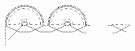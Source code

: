 \documentclass[aps,pra,reprint,superscriptaddress,twocolumn,notitlepage]{revtex4-1}
\numberwithin{equation}{section}
\begin{document}
\begin{equation}
    \tikz[scale=0.45,baseline=1.5ex]{
    \draw[dashed] (0,0) -- (1,0);
    \draw (-0.2,0.)-- (-0.2,-0.15);
    \draw (-0.2,-0.15)-- (1.,-0.7);
    \draw (1.2,-0.15)-- (1.2,0.0);
    \draw (1.2,-0.15)-- (0,-1.45);
    \draw[densely dotted,thick] (-0.3,0.)-- (-0.3,-2);
    \draw[densely dotted,thick] (1.3,-0.1)-- (1.3,0.);
    \draw[dashed] (2,0) -- (3,0);
    \draw (1.8,0.)-- (1.8,-0.15);
    \draw (1.8,-0.15)-- (3.,-0.7);
    \draw (3.2,-0.15)-- (3.2,0.);
    \draw (3.2,-0.15)-- (2,-0.7);
    \draw[densely dotted,thick] (1.7,0.)-- (1.7,-0.1);
    \draw[densely dotted,thick] (3.3,-0.1)-- (3.3,0.);
    \draw[dashed] (4,0) -- (5,0);
    \draw (3.8,0.)-- (3.8,-0.15);
    \draw (3.8,-0.15)-- (5.,-0.7);
    \draw (5.2,-0.15)-- (5.2,0.);
    \draw (5.2,-0.15)-- (4,-0.7);
    \draw[densely dotted,thick] (3.7,0.)-- (3.7,-0.1);
    \draw[densely dotted,thick] (5.3,-0.1)-- (5.3,0.);
    \draw[dashed] (6,0) -- (7,0);
    \draw (5.8,0.)-- (5.8,-0.15);
    \draw (5.8,-0.15)-- (7.,-0.8);
    \draw (7.3,-0.8)-- (7.,-0.8);
    \draw (7.2,-0.15)-- (7.2,0.);
    \draw (7.2,-0.15)-- (6,-0.7);
    \draw[densely dotted,thick] (5.7,0.)-- (5.7,-0.1);
    \draw[densely dotted,thick] (7.3,0)-- (7.3,-0.1);
    \draw[densely dotted,thick] (7.3,-0.1)-- (7.7,-0.1);
    \draw[densely dotted,thick] (1.3,-0.1)--(1.7,-0.1);
    \draw[densely dotted,thick] (3.3,-0.1)--(3.7,-0.1);
    \draw[densely dotted,thick] (5.3,-0.1)--(5.7,-0.1);
    \draw (1.0,-0.7)-- (2,-0.7);
    \draw (3.0,-0.7)-- (4,-0.7);
    \draw (5.0,-0.7)-- (6,-0.7);
    \draw[densely dotted,thick] (3.3,0) arc (0:180:1.8);
    \draw[densely dotted,thick] (1.7,0) arc (0:180:0.2);
    \draw[dashed] (2.0,0) arc (0:180:0.5);
    \draw[dashed] (3.0,0) arc (0:180:1.5);
    \draw (1.8,0) arc (0:180:0.3);
    \draw (3.2,0) arc (0:180:1.7);
    \draw[densely dotted,thick] (7.3,0) arc (0:180:1.8);
    \draw[densely dotted,thick] (5.7,0) arc (0:180:0.2);
    \draw[dashed] (6.0,0) arc (0:180:0.5);
    \draw[dashed] (7.0,0) arc (0:180:1.5);
    \draw (5.8,0) arc (0:180:0.3);
    \draw (7.2,0) arc (0:180:1.7);
    \draw[dashed] (10,0) -- (11,0);
    \draw (9.8,0.)-- (9.8,-0.15);
    \draw (9.8,-0.15)-- (11,-0.7);
    \draw (11.2,-0.15)-- (11.2,0.0);
    \draw (11.2,-0.15)-- (10,-0.8);
    \draw (9.7,-0.8)-- (10,-0.8);
    \draw[densely dotted,thick] (9.7,0.)-- (9.7,-0.1);
    \draw[densely dotted,thick] (9.3,-0.1)-- (9.7,-0.1);
    \draw[densely dotted,thick] (11.3,-0.1)-- (11.3,0.);
}
\end{equation}
\end{document}
